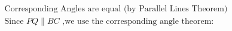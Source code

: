 \documentclass[preview]{standalone}
\begin{document}
\begin{align*}
\text{Corresponding Angles are equal (by Parallel Lines Theorem)}\\ \text{Since } PQ \parallel BC \text{ ,we use the corresponding angle theorem: }
\end{align*}
\end{document}
